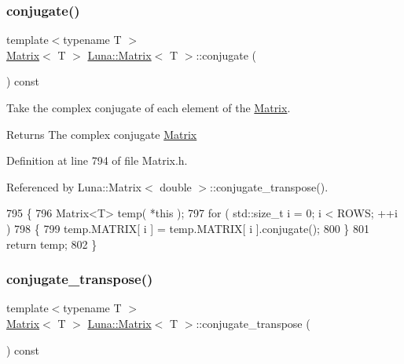 \subsubsection{\texorpdfstring{conjugate()}{conjugate()}}
{\footnotesize\ttfamily template$<$typename T $>$ \\
\hyperlink{classLuna_1_1Matrix}{Matrix}$<$ T $>$ \hyperlink{classLuna_1_1Matrix}{Luna\+::\+Matrix}$<$ T $>$\+::conjugate (\begin{DoxyParamCaption}{ }\end{DoxyParamCaption}) const\hspace{0.3cm}{\ttfamily [inline]}}



Take the complex conjugate of each element of the \hyperlink{classLuna_1_1Matrix}{Matrix}. 

\begin{DoxyReturn}{Returns}
The complex conjugate \hyperlink{classLuna_1_1Matrix}{Matrix} 
\end{DoxyReturn}


Definition at line 794 of file Matrix.\+h.



Referenced by Luna\+::\+Matrix$<$ double $>$\+::conjugate\+\_\+transpose().


\begin{DoxyCode}
795   \{
796      Matrix<T> temp( *\textcolor{keyword}{this} );
797      \textcolor{keywordflow}{for} ( std::size\_t i = 0; i < ROWS; ++i )
798      \{
799        temp.MATRIX[ i ] = temp.MATRIX[ i ].conjugate();
800      \}
801      \textcolor{keywordflow}{return} temp;
802   \}
\end{DoxyCode}
\mbox{\label{classLuna_1_1Matrix_ae2b183ce0d818f9467e12754873ed391}} 
\subsubsection{\texorpdfstring{conjugate\+\_\+transpose()}{conjugate\_transpose()}}
{\footnotesize\ttfamily template$<$typename T $>$ \\
\hyperlink{classLuna_1_1Matrix}{Matrix}$<$ T $>$ \hyperlink{classLuna_1_1Matrix}{Luna\+::\+Matrix}$<$ T $>$\+::conjugate\+\_\+transpose (\begin{DoxyParamCaption}{ }\end{DoxyParamCaption}) const\hspace{0.3cm}{\ttfamily [inline]}}



